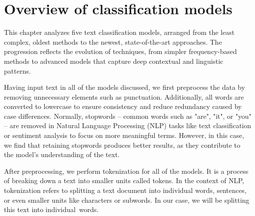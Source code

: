 

\chapter{Overview of classification models}
\label{05_Models_Overview}
\thispagestyle{empty}

This chapter analyzes five text classification models, arranged from the least complex, oldest methods to the newest, state-of-the-art approaches. The progression reflects the evolution of techniques, from simpler frequency-based methods to advanced models that capture deep contextual and linguistic patterns.

\vspace{3mm} 

\label{Text Preprocessing}
\noindent Having input text in all of the models discussed, we first preprocess the data by removing unnecessary elements such as punctuation. Additionally, all words are converted to lowercase to ensure consistency and reduce redundancy caused by case differences. Normally, stopwords -- common words such as "are", "it", or "you" -- are removed in Natural Language Processing (NLP) tasks like text classification or sentiment analysis to focus on more meaningful terms. However, in this case, we find that retaining stopwords produces better results, as they contribute to the model's understanding of the text.

\vspace{3mm} 

\noindent After preprocessing, we perform tokenization for all of the models. It is a process of breaking down a text into smaller units called tokens. In the context of NLP, tokenization refers to splitting a text document into individual words, sentences, or even smaller units like characters or subwords. In our case, we will be splitting this text into individual~words.






